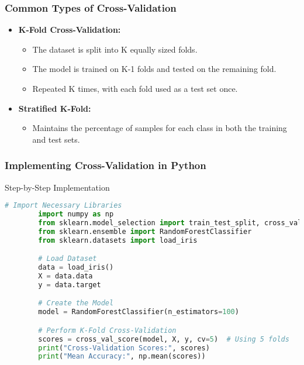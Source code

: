 \documentclass{beamer}
\begin{document}
\begin{frame}[fragile]
    \frametitle{Common Types of Cross-Validation}
    \begin{itemize}
        \item \textbf{K-Fold Cross-Validation:}
            \begin{itemize}
                \item The dataset is split into K equally sized folds.
                \item The model is trained on K-1 folds and tested on the remaining fold.
                \item Repeated K times, with each fold used as a test set once.
            \end{itemize}
        \item \textbf{Stratified K-Fold:}
            \begin{itemize}
                \item Maintains the percentage of samples for each class in both the training and test sets.
            \end{itemize}
    \end{itemize}
\end{frame}

\begin{frame}[fragile]
    \frametitle{Implementing Cross-Validation in Python}
    \begin{block}{Step-by-Step Implementation}
        \begin{lstlisting}[language=Python]
        # Import Necessary Libraries
        import numpy as np
        from sklearn.model_selection import train_test_split, cross_val_score
        from sklearn.ensemble import RandomForestClassifier
        from sklearn.datasets import load_iris

        # Load Dataset
        data = load_iris()
        X = data.data
        y = data.target

        # Create the Model
        model = RandomForestClassifier(n_estimators=100)

        # Perform K-Fold Cross-Validation
        scores = cross_val_score(model, X, y, cv=5)  # Using 5 folds
        print("Cross-Validation Scores:", scores)
        print("Mean Accuracy:", np.mean(scores))
        \end{lstlisting}
    \end{block}
\end{frame}
\end{document}
